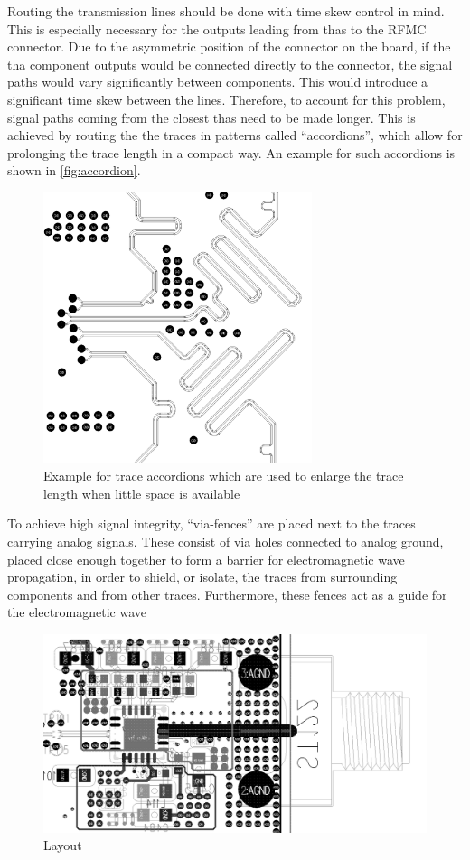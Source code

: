 Routing the transmission lines should be done with time skew control in mind. 
This is especially necessary for the outputs leading from \glspl{tha} to the RFMC connector. 
Due to the asymmetric position of the connector on the board, if the \gls{tha} component outputs would be connected directly to the connector, the signal paths would vary significantly between components.
This would introduce a significant time skew between the lines.
Therefore, to account for this problem, signal paths coming from the closest \glspl{tha} need to be made longer.
This is achieved by routing the the traces in patterns called ``accordions'', which allow for prolonging the trace length in a compact way.
An example for such accordions is shown in \autoref{fig:accordion}.
\begin{figure}[tbh]
	\centering
	\includegraphics[width = 0.7\textwidth]{chap/04-theresa/img/pcb/accordion}
	\caption[Trace accordions]{Example for trace accordions which are used to enlarge the trace length when little space is available}
	\label{fig:accordion}
\end{figure}

To achieve high signal integrity, ``via-fences'' are placed next to the traces carrying analog signals. 
These consist of via holes connected to analog ground, placed close enough together to form a barrier for electromagnetic wave propagation, in order to shield, or isolate, the traces from surrounding components and from other traces. 
Furthermore, these fences act as a guide for the electromagnetic wave 


 \begin{figure}[tbh]
 	\centering
 	\includegraphics[width = \textwidth]{chap/04-theresa/img/pcb/tha_pcb}
 	\caption[THA layout]{Layout }
 	\label{fig:stitch}
 \end{figure}